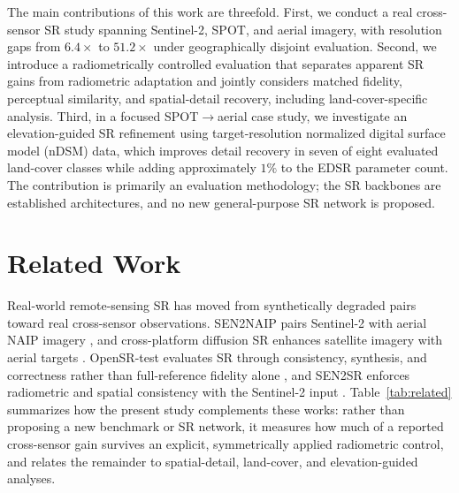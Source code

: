 \documentclass[conference]{IEEEtran}
\begin{document}
The main contributions of this work are threefold. First, we conduct
a real cross-sensor SR study spanning Sentinel-2, SPOT, and aerial
imagery, with resolution gaps from $6.4\times$ to $51.2\times$ under
geographically disjoint evaluation. Second, we introduce a
radiometrically controlled evaluation that separates apparent SR gains
from radiometric adaptation and jointly considers matched fidelity,
perceptual similarity, and spatial-detail recovery, including
land-cover-specific analysis. Third, in a focused SPOT$\rightarrow$aerial case
study, we investigate an elevation-guided SR refinement using
target-resolution normalized digital surface model (nDSM) data, which improves detail recovery in seven of
eight evaluated land-cover classes while adding approximately $1\%$
to the EDSR parameter count. The contribution is primarily an
evaluation methodology; the SR backbones are established
architectures, and no new general-purpose SR network is proposed.

\section{Related Work}
\label{sec:related}

Real-world remote-sensing SR has moved from synthetically degraded
pairs toward real cross-sensor observations. SEN2NAIP pairs
Sentinel-2 with aerial NAIP imagery \cite{aybar2024sen2naip}, and
cross-platform diffusion SR enhances satellite imagery with aerial
targets \cite{wang2026crossplatform}. OpenSR-test evaluates SR through
consistency, synthesis, and correctness rather than full-reference
fidelity alone \cite{aybar2024benchmark}, and SEN2SR enforces
radiometric and spatial consistency with the Sentinel-2 input
\cite{aybar2026sen2sr}. Table~\ref{tab:related} summarizes how the
present study complements these works: rather than proposing a new
benchmark or SR network, it measures how much of a reported
cross-sensor gain survives an explicit, symmetrically applied
radiometric control, and relates the remainder to spatial-detail,
land-cover, and elevation-guided analyses.
\end{document}
